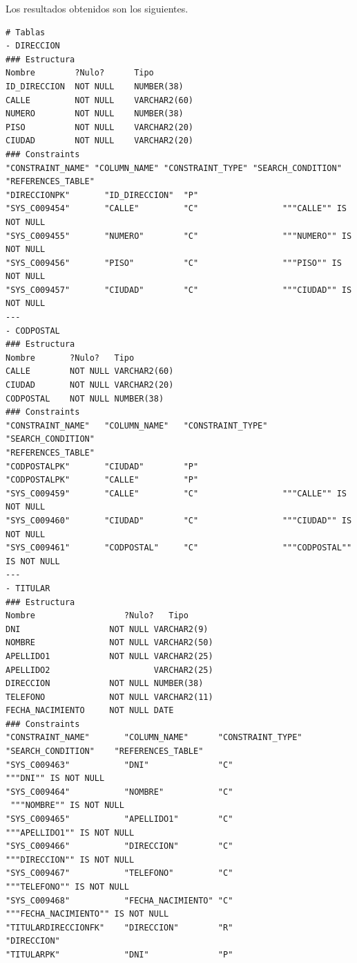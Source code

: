 \documentclass{article}
\begin{document}
Los resultados obtenidos son los siguientes.\\
\begin{lstlisting}
# Tablas
- DIRECCION
### Estructura
Nombre        ?Nulo?      Tipo
ID_DIRECCION  NOT NULL    NUMBER(38)
CALLE         NOT NULL    VARCHAR2(60)
NUMERO        NOT NULL    NUMBER(38)
PISO          NOT NULL    VARCHAR2(20)
CIUDAD        NOT NULL    VARCHAR2(20)
### Constraints
"CONSTRAINT_NAME" "COLUMN_NAME" "CONSTRAINT_TYPE" "SEARCH_CONDITION"
"REFERENCES_TABLE"
"DIRECCIONPK"	    "ID_DIRECCION"	"P"	
"SYS_C009454"	    "CALLE"	        "C"	                """CALLE"" IS NOT NULL	
"SYS_C009455"	    "NUMERO"	    "C"	                """NUMERO"" IS NOT NULL	
"SYS_C009456"	    "PISO"	        "C"	                """PISO"" IS NOT NULL	
"SYS_C009457"	    "CIUDAD"	    "C"	                """CIUDAD"" IS NOT NULL	
---
- CODPOSTAL
### Estructura
Nombre       ?Nulo?   Tipo
CALLE        NOT NULL VARCHAR2(60)
CIUDAD       NOT NULL VARCHAR2(20)
CODPOSTAL    NOT NULL NUMBER(38)
### Constraints
"CONSTRAINT_NAME"	"COLUMN_NAME"	"CONSTRAINT_TYPE"	"SEARCH_CONDITION"
"REFERENCES_TABLE"
"CODPOSTALPK"	    "CIUDAD"	    "P"	
"CODPOSTALPK"	    "CALLE"	        "P"	
"SYS_C009459"	    "CALLE"	        "C"	                """CALLE"" IS NOT NULL	
"SYS_C009460"	    "CIUDAD"	    "C"	                """CIUDAD"" IS NOT NULL	
"SYS_C009461"	    "CODPOSTAL"	    "C"	                """CODPOSTAL"" IS NOT NULL
---
- TITULAR
### Estructura
Nombre					?Nulo?   Tipo
DNI                  NOT NULL VARCHAR2(9)
NOMBRE               NOT NULL VARCHAR2(50)
APELLIDO1            NOT NULL VARCHAR2(25)
APELLIDO2                     VARCHAR2(25)
DIRECCION            NOT NULL NUMBER(38)
TELEFONO             NOT NULL VARCHAR2(11)
FECHA_NACIMIENTO     NOT NULL DATE
### Constraints
"CONSTRAINT_NAME"       "COLUMN_NAME"      "CONSTRAINT_TYPE"
"SEARCH_CONDITION"    "REFERENCES_TABLE"
"SYS_C009463"           "DNI"              "C"                  
"""DNI"" IS NOT NULL    
"SYS_C009464"           "NOMBRE"           "C"                 
 """NOMBRE"" IS NOT NULL    
"SYS_C009465"           "APELLIDO1"        "C"                 
"""APELLIDO1"" IS NOT NULL    
"SYS_C009466"           "DIRECCION"        "C"                 
"""DIRECCION"" IS NOT NULL    
"SYS_C009467"           "TELEFONO"         "C"                  
"""TELEFONO"" IS NOT NULL    
"SYS_C009468"           "FECHA_NACIMIENTO" "C"          
"""FECHA_NACIMIENTO"" IS NOT NULL    
"TITULARDIRECCIONFK"    "DIRECCION"        "R"                                        "DIRECCION"
"TITULARPK"             "DNI"              "P"        

\end{lstlisting}
\end{document}
